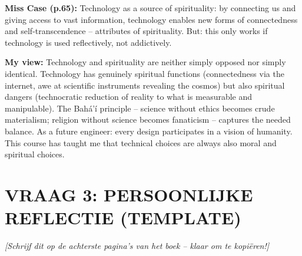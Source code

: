 \documentclass[a4paper,10pt]{article}
\begin{document}
\begin{answerbox}
\textbf{Miss Case (p.65):} Technology as a source of spirituality: by connecting us and giving access to vast information, technology enables new forms of connectedness and self-transcendence -- attributes of spirituality. But: this only works if technology is used reflectively, not addictively.

\textbf{My view:} Technology and spirituality are neither simply opposed nor simply identical. Technology has genuinely spiritual functions (connectedness via the internet, awe at scientific instruments revealing the cosmos) but also spiritual dangers (technocratic reduction of reality to what is measurable and manipulable). The Bah\'a'\'i\xspace principle -- science without ethics becomes crude materialism; religion without science becomes fanaticism -- captures the needed balance. As a future engineer: every design participates in a vision of humanity. This course has taught me that technical choices are always also moral and spiritual choices.
\end{answerbox}

\vspace{8pt}

\section{VRAAG 3: PERSOONLIJKE REFLECTIE (TEMPLATE)}

\textit{[Schrijf dit op de achterste pagina's van het boek -- klaar om te kopiëren!]}
\end{document}
